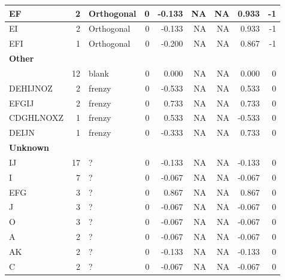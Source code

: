 \documentclass[
  letterpaper,
  DIV=11,
  numbers=noendperiod]{scrreprt}
\begin{document}
\begin{tabular}[t]{l|r|l|r|r|r|r|r|r}
\hline
\hspace{1em}EF & 2 & Orthogonal & 0 & -0.133 & NA & NA & 0.933 & -1\\
\hline
\hspace{1em}EI & 2 & Orthogonal & 0 & -0.133 & NA & NA & 0.933 & -1\\
\hline
\hspace{1em}EFI & 1 & Orthogonal & 0 & -0.200 & NA & NA & 0.867 & -1\\
\hline
\multicolumn{9}{l}{\textbf{Other}}\\
\hline
\hspace{1em} & 12 & blank & 0 & 0.000 & NA & NA & 0.000 & 0\\
\hline
\hspace{1em}DEHIJNOZ & 2 & frenzy & 0 & -0.533 & NA & NA & 0.533 & 0\\
\hline
\hspace{1em}EFGIJ & 2 & frenzy & 0 & 0.733 & NA & NA & 0.733 & 0\\
\hline
\hspace{1em}CDGHLNOXZ & 1 & frenzy & 0 & 0.533 & NA & NA & -0.533 & 0\\
\hline
\hspace{1em}DEIJN & 1 & frenzy & 0 & -0.333 & NA & NA & 0.733 & 0\\
\hline
\multicolumn{9}{l}{\textbf{Unknown}}\\
\hline
\hspace{1em}IJ & 17 & ? & 0 & -0.133 & NA & NA & -0.133 & 0\\
\hline
\hspace{1em}I & 7 & ? & 0 & -0.067 & NA & NA & -0.067 & 0\\
\hline
\hspace{1em}EFG & 3 & ? & 0 & 0.867 & NA & NA & 0.867 & 0\\
\hline
\hspace{1em}J & 3 & ? & 0 & -0.067 & NA & NA & -0.067 & 0\\
\hline
\hspace{1em}O & 3 & ? & 0 & -0.067 & NA & NA & -0.067 & 0\\
\hline
\hspace{1em}A & 2 & ? & 0 & -0.067 & NA & NA & -0.067 & 0\\
\hline
\hspace{1em}AK & 2 & ? & 0 & -0.133 & NA & NA & -0.133 & 0\\
\hline
\hspace{1em}C & 2 & ? & 0 & -0.067 & NA & NA & -0.067 & 0\\
\hline

\end{tabular}
\end{document}
